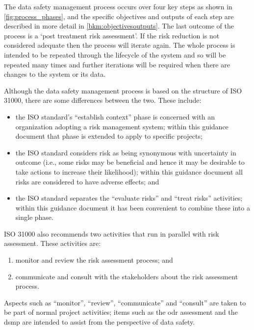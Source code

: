 The data safety management process occurs over four key steps as shown in \autoref{fig:process_phases}, and the specific
objectives and outputs of each step are described in more detail in \autoref{bkm:objectivesoutputs}. The last outcome of the
process is a `post \gls{treatment} risk assessment'. If the risk reduction is not considered adequate then
the process will iterate again. The whole process is intended to be repeated through the lifecycle of
the system and so will be repeated many times and further iterations will be required when there
are changes to the system or its data.

Although the data safety management process is based on the structure of ISO 31000, there are
some differences between the two. These include:
\begin{itemize}
\item the ISO standard’s ``establish context'' phase is concerned with an organization adopting a
	risk management system; within this guidance document that phase is extended to apply to
	specific projects;
\item the ISO standard considers risk as being synonymous with uncertainty in outcome (i.e.,
	some risks may be beneficial and hence it may be desirable to take actions to increase their
	likelihood); within this guidance document all risks are considered to have adverse effects;
	and
\item the ISO standard separates the ``evaluate risks'' and ``\gls{treat} risks'' activities; within this
	guidance document it has been convenient to combine these into a single phase.
\end{itemize}

ISO 31000 also recommends two activities that run in parallel with risk assessment. These activities
are:
\begin{enumerate}
\item monitor and review the risk assessment process; and 
\item communicate and consult with the
\glspl{stakeholder} about the risk assessment process. 
\end{enumerate}
Aspects such as ``monitor'', ``review'', ``communicate''
and ``consult'' are taken to be part of normal project activities; items such as the \gls{odr} assessment and
the \gls{dsmp} are intended to assist from the perspective of data safety.

